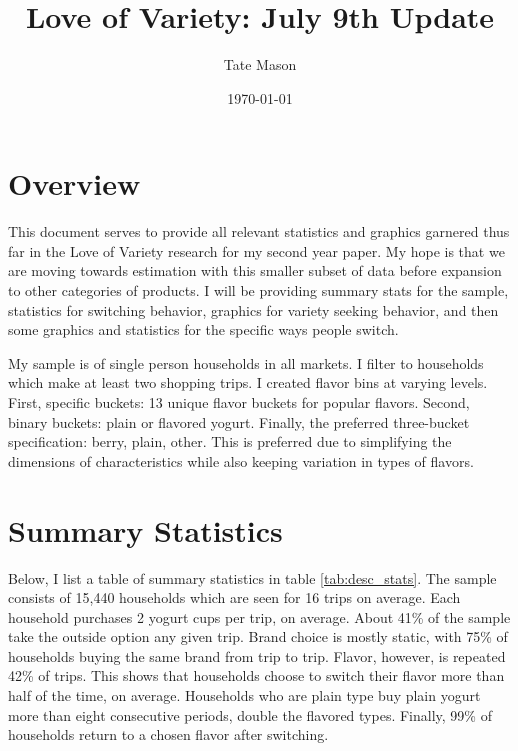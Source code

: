 \documentclass[11pt]{article}
\title{Love of Variety: July 9th Update}
\author{Tate Mason}
\date{\today}
\theoremstyle{definition}
\theoremstyle{remark}
\begin{document}
\maketitle
\thispagestyle{empty}

\section{Overview}

This document serves to provide all relevant statistics and graphics garnered thus far in the Love of Variety research for my second year paper. My hope is that we are moving towards estimation with this smaller subset of data before expansion to other categories of products. I will be providing summary stats for the sample, statistics for switching behavior, graphics for variety seeking behavior, and then some graphics and statistics for the specific ways people switch.

My sample is of single person households in all markets. I filter to households which make at least two shopping trips. I created flavor bins at varying levels. First, specific buckets: 13 unique flavor buckets for popular flavors. Second, binary buckets: plain or flavored yogurt. Finally, the preferred three-bucket specification: berry, plain, other. This is preferred due to simplifying the dimensions of characteristics while also keeping variation in types of flavors. 

\section{Summary Statistics}

Below, I list a table of summary statistics in table \ref{tab:desc_stats}. The sample consists of 15,440 households which are seen for 16 trips on average. Each household purchases 2 yogurt cups per trip, on average. About 41\% of the sample take the outside option any given trip. Brand choice is mostly static, with 75\% of households buying the same brand from trip to trip. Flavor, however, is repeated 42\% of trips. This shows that households choose to switch their flavor more than half of the time, on average. Households who are plain type buy plain yogurt more than eight consecutive periods, double the flavored types. Finally, 99\% of households return to a chosen flavor after switching.
\end{document}
